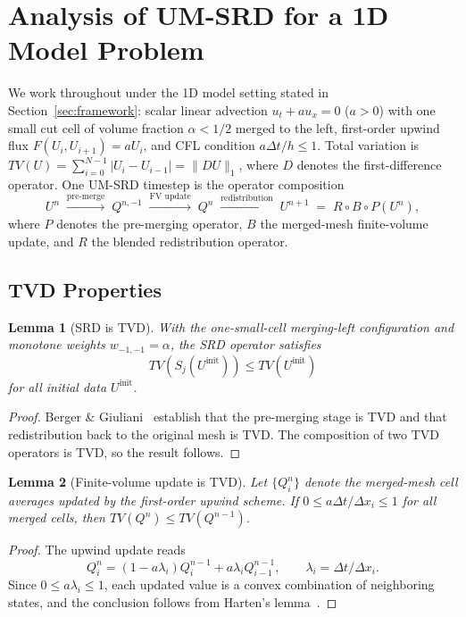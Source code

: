 \documentclass[11pt]{article}
\newtheorem{lemma}{Lemma}
\begin{document}
\section{Analysis of UM-SRD for a 1D Model Problem}
\label{sec:analysis-1D}

We work throughout under the 1D model setting stated in 
Section~\ref{sec:framework}: scalar linear advection $u_t + au_x = 0$ 
($a > 0$) with one small cut cell of volume fraction $\alpha < 1/2$ merged 
to the left, first-order upwind flux $F(U_i, U_{i+1}) = aU_i$, and CFL 
condition $a\Delta t/h \le 1$. Total variation is $TV(U) = 
\sum_{i=0}^{N-1}|U_i - U_{i-1}| = \|DU\|_1$, where $D$ denotes the 
first-difference operator. One UM-SRD timestep is the operator composition
\[
U^n
\;\xrightarrow{\text{pre-merge}}\;
Q^{n,-1}
\;\xrightarrow{\text{FV update}}\;
Q^n
\;\xrightarrow{\text{redistribution}}\;
U^{n+1}
\;=\;
R \circ B \circ P(U^n),
\]
where $P$ denotes the pre-merging operator, $B$ the merged-mesh 
finite-volume update, and $R$ the blended redistribution operator.

\subsection{TVD Properties}

\begin{lemma}[SRD is TVD]
\label{lem:TVD-SRD}
With the one-small-cell merging-left configuration and monotone weights
$w_{-1,-1} = \alpha$, the SRD operator satisfies
\[
  TV\!\left(S_j(U^{\mathrm{init}})\right) \le TV(U^{\mathrm{init}})
\]
for all initial data $U^{\mathrm{init}}$.
\end{lemma}

\begin{proof}
Berger \& Giuliani~\cite{berger2024} establish that the pre-merging stage
is TVD and that redistribution back to the original mesh is TVD. The
composition of two TVD operators is TVD, so the result follows.
\end{proof}

\begin{lemma}[Finite-volume update is TVD]
\label{lem:TVD-Q-update}
Let $\{Q_i^n\}$ denote the merged-mesh cell averages updated by the
first-order upwind scheme. If $0 \le a\Delta t / \Delta x_i \le 1$ for
all merged cells, then $TV(Q^n) \le TV(Q^{n-1})$.
\end{lemma}

\begin{proof}
The upwind update reads
\[
  Q_i^n = (1 - a\lambda_i) Q_i^{n-1} + a\lambda_i Q_{i-1}^{n-1},
  \qquad \lambda_i = \Delta t / \Delta x_i.
\]
Since $0 \le a\lambda_i \le 1$, each updated value is a convex combination
of neighboring states, and the conclusion follows from Harten's
lemma~\cite{harten1983lax}.
\end{proof}
\end{document}
